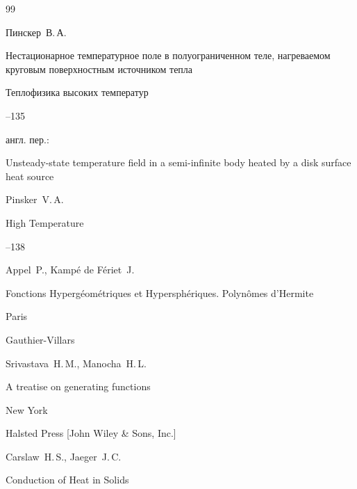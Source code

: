\begin{thebibliography}{99}




\by Пинскер~В.\,А.

\paper Нестационарное температурное поле в полуограниченном теле, нагреваемом круговым поверхностным источником тепла

\jour Теплофизика высоких температур




--135

\transl англ. пер.:~

\paper Unsteady-state temperature field in a semi-infinite body heated by a disk surface heat source

\by Pinsker~V.\,A.

\jour High Temperature




--138




\by  Appel~P.,  Kamp\'e de F\'eriet~J.

\book Fonctions Hyperg\'eom\'etriques et Hypersph\'eriques. Polyn\^omes d’Hermite

\publaddr Paris

\publ Gauthier-Villars






\by  Srivastava~H.\,M.,  Manocha~H.\,L.

\book A  treatise  on  generating  functions 

\publaddr New York

\publ Halsted Press [John Wiley \& Sons, Inc.]








\by Carslaw~H.\,S., Jaeger~J.\,C.

\book Conduction of Heat in Solids


\end{thebibliography}
